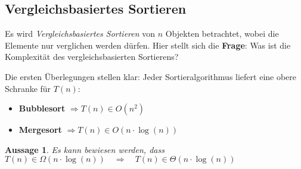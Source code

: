 \documentclass{scrartcl}%
\newtheorem{theorem}{Aussage}
\begin{document}
    \subsection*{Vergleichsbasiertes Sortieren}
    \label{subsec:vergleichsbasiertessortieren}

    Es wird \textit{Vergleichsbasiertes Sortieren} von $n$ Objekten betrachtet, wobei die Elemente nur verglichen werden dürfen.
    Hier stellt sich die \textbf{Frage}: Was ist die Komplexität des vergleichsbasierten Sortierens?

    Die ersten Überlegungen stellen klar: Jeder Sortieralgorithmus liefert eine obere Schranke für $T(n)$:
    \begin{itemize}
        \item \textbf{Bubblesort} $\Rightarrow T(n) \in O(n^2)$
        \item \textbf{Mergesort} $\Rightarrow T(n) \in O(n \cdot \log(n))$
    \end{itemize}
    \newpage
    \begin{theorem}
        Es kann bewiesen werden, dass $T(n) \in \Omega(n \cdot \log(n)) \quad \Rightarrow \quad T(n) \in \Theta(n \cdot \log(n))$
    \end{theorem}
\end{document}
